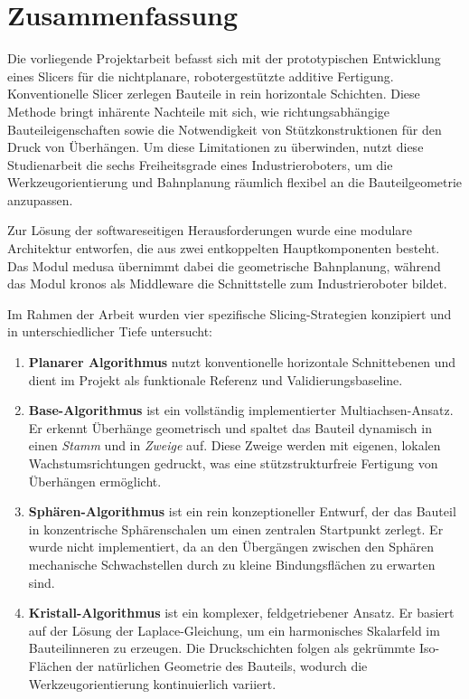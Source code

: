 \chapter*{Zusammenfassung}\label{chap:summary}
{}
\medskip
\noindent
Die vorliegende Projektarbeit befasst sich mit der prototypischen Entwicklung eines Slicers für die nichtplanare, robotergestützte additive Fertigung.
Konventionelle Slicer zerlegen Bauteile in rein horizontale Schichten.
Diese Methode bringt inhärente Nachteile mit sich, wie richtungsabhängige Bauteileigenschaften sowie die Notwendigkeit von Stützkonstruktionen für den Druck von Überhängen.
Um diese Limitationen zu überwinden, nutzt diese Studienarbeit die sechs Freiheitsgrade eines Industrieroboters, um die Werkzeugorientierung und Bahnplanung räumlich flexibel an die Bauteilgeometrie anzupassen.

Zur Lösung der softwareseitigen Herausforderungen wurde eine modulare Architektur entworfen, die aus zwei entkoppelten Hauptkomponenten besteht.
Das Modul \acs{medusa} übernimmt dabei die geometrische Bahnplanung, während das Modul \acs{kronos} als Middleware die Schnittstelle zum Industrieroboter bildet.

Im Rahmen der Arbeit wurden vier spezifische Slicing-Strategien konzipiert und in unterschiedlicher Tiefe untersucht:

\begin{enumerate}
    \item \textbf{Planarer Algorithmus} nutzt konventionelle horizontale Schnittebenen und dient im Projekt als funktionale Referenz und Validierungsbaseline.
    \item \textbf{Base-Algorithmus} ist ein vollständig implementierter Multiachsen-Ansatz.
    Er erkennt Überhänge geometrisch und spaltet das Bauteil dynamisch in einen \emph{Stamm} und in \emph{Zweige} auf.
    Diese Zweige werden mit eigenen, lokalen Wachstumsrichtungen gedruckt, was eine stützstrukturfreie Fertigung von Überhängen ermöglicht.
    \item \textbf{Sphären-Algorithmus} ist ein rein konzeptioneller Entwurf, der das Bauteil in konzentrische Sphärenschalen um einen zentralen Startpunkt zerlegt.
    Er wurde nicht implementiert, da an den Übergängen zwischen den Sphären mechanische Schwachstellen durch zu kleine Bindungsflächen zu erwarten sind.
    \item \textbf{Kristall-Algorithmus} ist ein komplexer, feldgetriebener Ansatz.
    Er basiert auf der Lösung der Laplace-Gleichung, um ein harmonisches Skalarfeld im Bauteilinneren zu erzeugen.
    Die Druckschichten folgen als gekrümmte Iso-Flächen der natürlichen Geometrie des Bauteils, wodurch die Werkzeugorientierung kontinuierlich variiert.
\end{enumerate}

